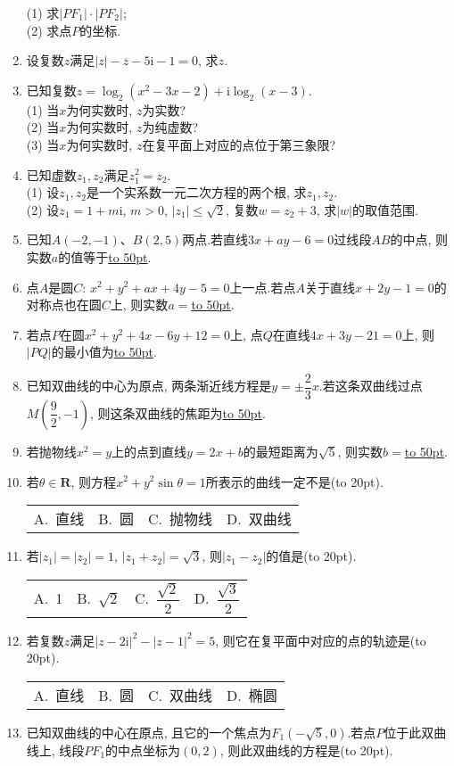 \documentclass[10pt,a4paper]{article}
\newcommand{\blank}[1]{\underline{\hbox to #1pt{}}}
\newcommand{\bracket}[1]{(\hbox to #1pt{})}
\newcommand{\fourch}[4]{\par\begin{tabular}{p{.23\textwidth}p{.23\textwidth}p{.23\textwidth}p{.23\textwidth}}
A.~#1 &B.~#2& C.~#3& D.~#4
\end{tabular}}
\begin{document}
\begin{enumerate}[1.]
\begin{center}
\end{center}
(1) 求$|PF_1|\cdot|PF_2|$;\\
(2) 求点$P$的坐标.
\item 设复数$z$满足$|z|-\overline  z-5\mathrm{i}-1=0$, 求$z$.
\item 已知复数$z=\log _2(x^2-3x-2)+\mathrm{i}\log _2(x-3)$.\\
(1) 当$x$为何实数时, $z$为实数?\\
(2) 当$x$为何实数时, $z$为纯虚数?\\
(3) 当$x$为何实数时, $z$在复平面上对应的点位于第三象限?
\item 已知虚数$z_1,z_2$满足$z_1^2=z_2$.\\
(1) 设$z_1,z_2$是一个实系数一元二次方程的两个根, 求$z_1,z_2$.\\
(2) 设$z_1=1+m\mathrm{i}$, $m>0$, $|z_1|\le \sqrt 2$, 复数$w=z_2+3$, 求$|w|$的取值范围.
\item 已知$A(-2,-1)$、$B(2,5)$两点.若直线$3x+ay-6=0$过线段$AB$的中点, 则实数$a$的值等于\blank{50}.
\item 点$A$是圆$C$: $x^2+y^2+ax+4y-5=0$上一点.若点$A$关于直线$x+2y-1=0$的对称点也在圆$C$上, 则实数$a=$\blank{50}.
\item 若点$P$在圆$x^2+y^2+4x-6y+12=0$上, 点$Q$在直线$4x+3y-21=0$上, 则$|PQ|$的最小值为\blank{50}.
\item 已知双曲线的中心为原点, 两条渐近线方程是$y=\pm \dfrac 23x$.若这条双曲线过点$M(\dfrac 92,-1)$, 则这条双曲线的焦距为\blank{50}.
\item 若抛物线$x^2=y$上的点到直线$y=2x+b$的最短距离为$\sqrt 5$, 则实数$b=$\blank{50}.
\item 若$\theta \in \mathbf{R}$, 则方程$x^2+y^2\sin \theta =1$所表示的曲线一定不是\bracket{20}.
\fourch{直线}{圆}{抛物线}{双曲线}
\item 若$|z_1|=|z_2|=1$, $|z_1+z_2|=\sqrt 3$, 则$|z_1-z_2|$的值是\bracket{20}.
\fourch{1}{$\sqrt 2$}{$\dfrac{\sqrt 2}2$}{$\dfrac{\sqrt 3}2$}
\item 若复数$z$满足$|z-2\mathrm{i}|^2-|z-1|^2=5$, 则它在复平面中对应的点的轨迹是\bracket{20}.
\fourch{直线}{圆}{双曲线}{椭圆}
\item 已知双曲线的中心在原点, 且它的一个焦点为$F_1(-\sqrt 5,0)$.若点$P$位于此双曲线上, 线段$PF_1$的中点坐标为$(0,2)$, 则此双曲线的方程是\bracket{20}.

\end{enumerate}
\end{document}
